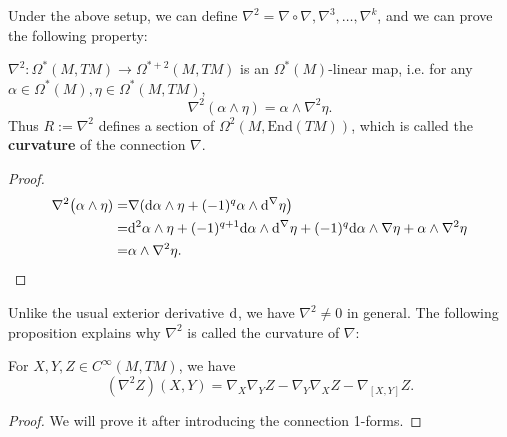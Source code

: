 Under the above setup, we can define $\nabla^2=\nabla\circ\nabla,\nabla^3,\dots,\nabla^k$, 
and we can prove the following property:
\begin{proposition}
    $\nabla^2: \Omega^*(M,TM)\to\Omega^{*+2}(M,TM)$ is an $\Omega^*(M)$-linear map, i.e. 
    for any $\alpha\in \Omega^*(M),\eta\in \Omega^*(M,TM)$, 
    \begin{equation*}
        \nabla^2(\alpha\wedge\eta) = \alpha\wedge\nabla^2 \eta.
    \end{equation*}
    Thus $R:=\nabla^2$ defines a section of $\Omega^2(M,\mathrm{End}(TM))$, 
    which is called the \textbf{curvature} of the connection $\nabla$.
\end{proposition}
\begin{proof}
    \begin{align*}
        \nabla^2\big(\alpha\wedge\eta) =& \nabla({\rm d}\alpha\wedge\eta + (-1)^{q}\alpha\wedge {\rm d}^\nabla\eta\big) \\
        =& {\rm d}^2\alpha\wedge\eta + (-1)^{q+1}{\rm d}\alpha\wedge {\rm d}^\nabla\eta + (-1)^q {\rm d}\alpha\wedge \nabla\eta + \alpha\wedge\nabla^2 \eta \\
        =& \alpha\wedge\nabla^2 \eta. \qedhere
    \end{align*}
\end{proof}
Unlike the usual exterior derivative ${\rm d}$, we have $\nabla^2\neq 0$ in general.
The following proposition explains why $\nabla^2$ is called the curvature of $\nabla$:
\begin{proposition}\label{prop:curvature}
    For $X,Y,Z\in C^\infty(M,TM)$, we have
    \begin{equation*}
        (\nabla^2 Z)(X,Y) = \nabla_X \nabla_Y Z - \nabla_Y \nabla_X Z - \nabla_{[X,Y]} Z.
    \end{equation*}
\end{proposition}
\begin{proof}
    We will prove it after introducing the connection 1-forms.
\end{proof}

